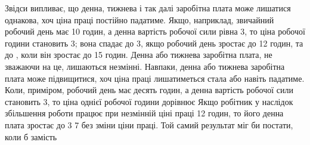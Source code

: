 Звідси випливає, що денна, тижнева і так далі заробітна плата
може лишатися однакова, хоч ціна праці постійно падатиме.
Якщо, наприклад, звичайний робочий день має 10 годин, а денна
вартість робочої сили рівна 3, то ціна робочої години
становить 3; вона спадає до 3, якщо робочий день
зростає до 12 годин, та до , коли він зростає до 15 годин.
Денна або тижнева заробітна плата, не зважаючи на це,
лишаються незмінні. Навпаки, денна або тижнева заробітна
плата може підвищитися, хоч ціна праці лишатиметься стала або
навіть падатиме. Коли, приміром, робочий день має десять годин,
а денна вартість робочої сили становить 3, то ціна однієї
робочої години дорівнює  Якщо робітник у наслідок
збільшення роботи працює при незмінній ціні праці 12 годин,
то його денна плата зростає до 3 7 без зміни
ціни праці. Той самий результат міг би постати, коли б замість
\parbreak{}  %
